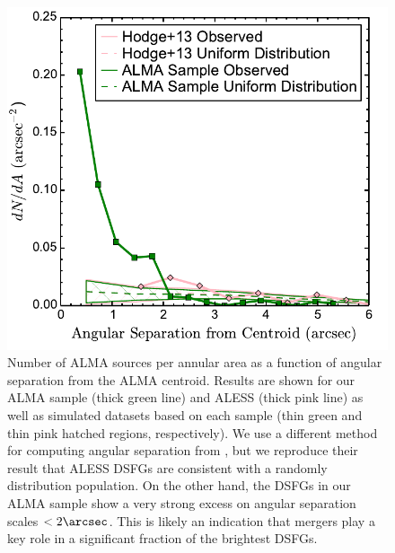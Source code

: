 \documentclass[iop]{emulateapj}
\begin{document}
\begin{figure}[!tbp] 
\includegraphics[width=\linewidth]{../Figures/dNdA.pdf}

\caption{ Number of ALMA sources per annular area as a function of angular
separation from the ALMA centroid.  Results are shown for our ALMA sample
(thick green line) and ALESS (thick pink line) as well as simulated datasets
based on each sample (thin green and thin pink hatched regions, respectively).
We use a different method for computing angular separation from
\citet{Hodge:2013qy}, but we reproduce their result that ALESS DSFGs are
consistent with a randomly distribution population.  On the other hand, the
DSFGs in our ALMA sample show a very strong excess on angular separation scales
$<2\arcsec$.  This is likely an indication that mergers play a key role in a
significant fraction of the brightest DSFGs.  } \label{fig:dNdA}

\end{figure}


\end{document}
